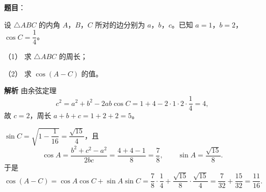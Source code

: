 \begin{answer}

\textbf{题目}：

设 $\triangle ABC$ 的内角 $A$，$B$，$C$ 所对的边分别为 $a$，$b$，$c$。已知 $a=1$，$b=2$，$\cos C=\dfrac14$。

（1） 求 $\triangle ABC$ 的周长；

（2） 求 $\cos(A-C)$ 的值。

\textbf{解析}
由余弦定理
\nopagebreak[4]
\[c^2=a^2+b^2-2ab\cos C=1+4-2\cdot1\cdot2\cdot\frac14=4,\]
故 $c=2$，周长 $a+b+c=1+2+2=5$。

$\sin C=\sqrt{1-\dfrac1{16}}=\dfrac{\sqrt{15}}4$，且
\nopagebreak[4]
\[\cos A=\frac{b^2+c^2-a^2}{2bc}=\frac{4+4-1}{8}=\frac78,\qquad\sin A=\frac{\sqrt{15}}8.\]
于是
\nopagebreak[4]
\[\cos(A-C)=\cos A\cos C+\sin A\sin C=\frac78\cdot\frac14+\frac{\sqrt{15}}8\cdot\frac{\sqrt{15}}4
=\frac7{32}+\frac{15}{32}=\frac{11}{16}.\]



\end{answer}
